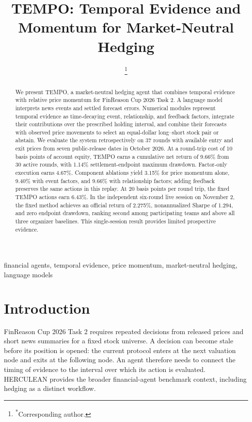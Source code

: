 \documentclass[conference]{IEEEtran}
\title{TEMPO: Temporal Evidence and Momentum for Market-Neutral Hedging}
\author{\IEEEauthorblockN{Yicheng He\textsuperscript{1,2} and Qianqian Xie\textsuperscript{1,2,*}}
\IEEEauthorblockA{\textsuperscript{1}School of Artificial Intelligence, Wuhan University, Wuhan, China\\
\textsuperscript{2}Cognitive Language and Information Lab, Wuhan University, Wuhan, China\\
Team TEMPO\\
xqq.sincere@gmail.com}
\thanks{\textsuperscript{*}Corresponding author.}}
\begin{document}
\maketitle

\begin{abstract}
We present TEMPO, a market-neutral hedging agent that combines temporal evidence with relative price momentum for FinReason Cup 2026 Task 2. A language model interprets news events and settled forecast errors. Numerical modules represent temporal evidence as time-decaying event, relationship, and feedback factors, integrate their contributions over the prescribed holding interval, and combine their forecasts with observed price movements to select an equal-dollar long--short stock pair or abstain. We evaluate the system retrospectively on 37 rounds with available entry and exit prices from seven public-release dates in October 2026. At a round-trip cost of 10 basis points of account equity, TEMPO earns a cumulative net return of 9.66\% from 30 active rounds, with 1.14\% settlement-endpoint maximum drawdown. Factor-only execution earns 4.67\%. Component ablations yield 3.15\% for price momentum alone, 9.40\% with event factors, and 9.66\% with relationship factors; adding feedback preserves the same actions in this replay. At 20 basis points per round trip, the fixed TEMPO actions earn 6.43\%. In the independent six-round live session on November 2, the fixed method achieves an official return of 2.275\%, nonannualized Sharpe of 1.294, and zero endpoint drawdown, ranking second among participating teams and above all three organizer baselines. This single-session result provides limited prospective evidence.
\end{abstract}

\begin{IEEEkeywords}
financial agents, temporal evidence, price momentum, market-neutral hedging, language models
\end{IEEEkeywords}

\section{Introduction}
FinReason Cup 2026 Task 2 requires repeated decisions from released prices and short news summaries for a fixed stock universe\cite{finreason2026overview,finreason2026task2overview}. A decision can become stale before its position is opened: the current protocol enters at the next valuation node and exits at the following node\cite{task2protocol}. An agent therefore needs to connect the timing of evidence to the interval over which its action is evaluated. HERCULEAN provides the broader financial-agent benchmark context, including hedging as a distinct workflow\cite{peng2026herculeanagenticbenchmarkfinancial}.
\end{document}
